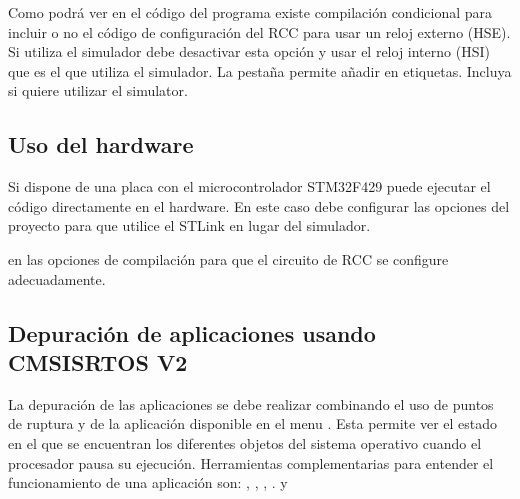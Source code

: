 \documentclass[letterpaper,10pt,english]{sphinxmanual}
\begin{document}
\sphinxAtStartPar
Como podrá ver en el código del programa  existe compilación condicional para incluir o no el código de configuración del RCC para usar un reloj externo (HSE).
Si utiliza el simulador debe desactivar esta opción y usar el reloj interno (HSI) que es el que utiliza el simulador. La pestaña  permite añadir en  etiquetas. Incluya  si quiere utilizar el simulator.


\subsection{Uso del hardware}
\label{\detokenize{cmsis-rtos:uso-del-hardware}}
\sphinxAtStartPar
Si dispone de una placa con el microcontrolador STM32F429 puede ejecutar el código directamente en el hardware. En este caso debe configurar las opciones del proyecto para que utilice el ST\sphinxhyphen{}Link en lugar del simulador.

\sphinxAtStartPar
{}  en las opciones de compilación para que el circuito de RCC se configure adecuadamente.


\subsection{Depuración de aplicaciones usando CMSIS\sphinxhyphen{}RTOS V2}
\label{\detokenize{cmsis-rtos:depuracion-de-aplicaciones-usando-cmsis-rtos-v2}}
\sphinxAtStartPar
La depuración de las aplicaciones se debe realizar combinando el uso de puntos de ruptura y de la aplicación  disponible en el menu .
Esta permite ver el estado en el que se encuentran los diferentes objetos del sistema operativo cuando el procesador pausa su ejecución. Herramientas complementarias para entender
el funcionamiento de una aplicación son: , , , .  y 
\end{document}
